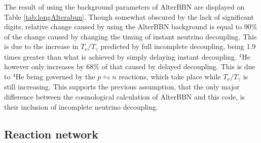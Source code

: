The result of using the background parameters of AlterBBN are displayed on Table \ref{tab:longAlterabun}. Though somewhat obscured by the lack of significant digits, relative change caused by using the AlterBBN background is equal to 90\% of the change caused by changing the timing of instant neutrino decoupling. This is due to the increase in $T_\nu/T_\gamma$ predicted by full incomplete decoupling, being 1.9 times greater than what is achieved by simply delaying instant decoupling. ${}^4$He however only increases by 68\% of that caused by delayed decoupling. This is due to ${}^4$He being governed by the $p\leftrightharpoons n$ reactions, which take place while $T_\nu/T_\gamma$ is still increasing. This supports the previous assumption, that the only major difference between the cosmological calculation of AlterBBN and this code, is their inclusion of incomplete neutrino decoupling.

\subsection{Reaction network}

